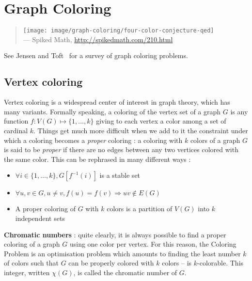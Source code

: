 
\chapter{Graph Coloring}
\label{chap:graph_coloring}

\begin{quote}
\texttt{[image: image/graph-coloring/four-color-conjecture-qed]} \\
\noindent
--- Spiked Math,
\url{http://spikedmath.com/210.html}
\end{quote}

\noindent
See Jensen and Toft~\cite{JensenToft1995} for a survey of graph
coloring problems.


\section{Vertex coloring}

Vertex coloring is a widespread center of interest in graph theory,
which has many variants. Formally speaking, a coloring of the vertex
set of a graph $G$ is any function $f:V(G) \mapsto \{1,\dots,k\}$ giving to each vertex a color among a set of cardinal $k$. Things get much more difficult when we add to it the constraint under which a coloring becomes a {\it proper} coloring : a coloring with $k$ colors of a graph $G$ is said to be {\it proper} if there are no edges between any two vertices colored with the same color. This can be rephrased in many different ways :
\begin{itemize}
\item $\forall i\in \{1,\dots,k\}, G[f^{-1}(i)]$ is a stable set
\item $\forall u,v\in G,u\neq v, f(u)=f(v)\Rightarrow uv\not \in E(G)$
\item A proper coloring of $G$ with $k$ colors is a partition of $V(G)$ into $k$ independent sets
\end{itemize}

{\bf Chromatic numbers} : quite clearly, it is always possible to find a proper coloring of a graph $G$ using one color per vertex. For this reason, the Coloring Problem is an optimisation problem which amounts to finding the least number $k$ of colors such that $G$ can be properly colored with $k$ colors -- is $k$-colorable. This integer, written $\chi(G)$, is called the chromatic number of $G$.

